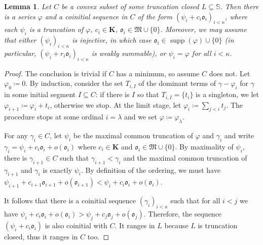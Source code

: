\documentclass{article}
\newcommand{\assign}{\coloneqq}
\newcommand{\tmop}[1]{\ensuremath{\operatorname{#1}}}
\newtheorem{lemma}[theorem]{Lemma}
\theoremstyle{remark}\newtheorem*{convention*}{Convention}
\begin{document}
\begin{lemma}
  \label{lem:coinitial-sequence}Let $C$ be a convex subset of some truncation
  closed $L \subseteq \mathbb{S}$. Then there is a series $\varphi$ and a
  coinitial sequence in $C$ of the form $(\psi_i + c_i \mathfrak{o}_i)_{i <
  \kappa}$, where each $\psi_i$ is a truncation of $\varphi$, $c_i \in
  \mathbf{K}$, $\mathfrak{o}_i \in \mathfrak{M} \cup \{ 0 \}$. Moreover, we
  may assume that either $(\psi_i)_{i < \kappa}$ is injective, in which case
  $\mathfrak{o}_i \in \tmop{supp} (\varphi) \cup \{ 0 \}$ (in particular,
  $(\psi_i + r_i \mathfrak{o}_i)_{i < \kappa}$ is weakly summable), or $\psi_i
  = \varphi$ for all $i < \kappa$.
\end{lemma}

\begin{proof}
  The conclusion is trivial if $C$ has a minimum, so assume $C$ does not. Let
  $\varphi_0 \assign 0$. By induction, consider the set $T_{i, I}$ of the
  dominant terms of $\gamma - \varphi_i$ for $\gamma$ in some initial segment
  $I \subseteq C$: if there is $I$ so that $T_{i, I} = \{ t_i \}$ is a
  singleton, we let $\varphi_{i + 1} \assign \varphi_i + t_i$, otherwise we
  stop. At the limit stage, let $\varphi_i \assign \sum_{j < i} t_j$. The
  procedure stops at some ordinal $i = \lambda$ and we set $\varphi \assign
  \varphi_{\lambda}$.
  
  For any $\gamma_i \in C$, let $\psi_i$ be the maximal common truncation of
  $\varphi$ and $\gamma_i$ and write $\gamma_i = \psi_i + c_i \mathfrak{o}_i +
  o (\mathfrak{o}_i)$ where $c_i \in \mathbf{K}$ and $\mathfrak{o}_i \in
  \mathfrak{M} \cup \{ 0 \}$. By maximality of $\psi_i$, there is $\gamma_{i +
  1} \in C$ such that $\gamma_{i + 1} < \gamma_i$ and the maximal common
  truncation of $\gamma_{i + 1}$ and $\gamma_i$ is exactly $\psi_i$. By
  definition of the ordering, we must have $\psi_{i + 1} + c_{i + 1}
  \mathfrak{o}_{i + 1} + o (\mathfrak{o}_{i + 1}) < \psi_i + c_i
  \mathfrak{o}_i + o (\mathfrak{o}_i)$.
  
  It follows that there is a coinitial sequence $(\gamma_i)_{i < \kappa}$ such
  that for all $i < j$ we have $\psi_i + c_i \mathfrak{o}_i + o
  (\mathfrak{o}_i) > \psi_j + c_j \mathfrak{o}_j + o (\mathfrak{o}_j)$.
  Therefore, the sequence $(\psi_i + c_i \mathfrak{o}_i)$ is also coinitial
  with $C$. It ranges in $L$ because $L$ is truncation closed, thus it ranges
  in $C$ too.
  

\end{proof}
\end{document}
